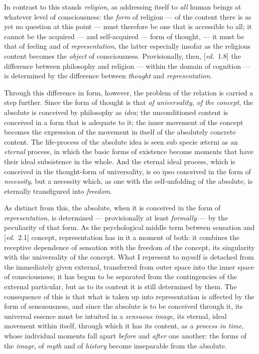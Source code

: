 \documentclass[12pt,a4paper,openany]{book}
\newcommand{\kpage}[1]{\marginnote{\footnotesize\textit{[#1]}}}
\newcommand{\ed}[1]{{\small[\textit{ed.}\ #1]}}
\begin{document}
In contrast to this stands \emph{religion}, as addressing itself to \emph{all}
human beings at whatever level of consciousness: the \emph{form} of religion
--- of the content there is as yet no question at this point --- must therefore
be one that is accessible to all; it cannot be the acquired
--- and self-acquired --- form of thought, --- it must be that of feeling
and of \emph{representation}, the latter especially insofar as the religious content
becomes the \emph{object} of consciousness. Provisionally, then, \ed{1.8} the difference
between philosophy and religion --- within the domain of cognition
--- is determined by the difference between \emph{thought} and \emph{representation}.

Through this difference in form, however, the problem of the relation is carried
a step further. Since the form of thought is that \emph{of universality, of the concept},
the absolute is conceived by philosophy as \emph{idea}; the unconditioned
content is conceived in a form that is adequate to it;
the inner movement of the concept becomes the expression of the movement in itself
of the absolutely concrete content. The life-process of the absolute idea is seen
sub specie æterni as an \emph{eternal} process, in which the basic forms of existence
become moments that have their ideal subsistence in the whole.
And the eternal ideal process, which is conceived in the thought-form
of universality, is eo ipso conceived in the form of \emph{necessity}, but a necessity
which, as one with the self-unfolding of the absolute, is eternally transfigured
into \emph{freedom}.

As distinct from this, the absolute, when it is conceived in the form of \emph{representation},
is determined --- provisionally at least \emph{formally} --- by the
peculiarity of that form. As the psychological middle term between
sensation and \ed{2.1} concept, representation has in it a moment of
both: it combines the receptive dependence of sensation with
the freedom of the concept, its singularity with the universality of the concept.
What I represent to myself is detached from the immediately given external,
transferred from outer space into the inner space of consciousness; it has begun
to be separated from the contingencies of the external particular, but as to its content
it is still determined by them. The consequence of this is that what is
taken up into representation is affected by the form of sensuousness, and since
the absolute is to be conceived through it, its universal essence must
be intuited in a \emph{sensuous image}, its eternal, ideal movement within itself,
through which it has its content, as a \emph{process in time}, whose individual
\kpage{78}moments fall apart \emph{before} and \emph{after} one another: the forms of the \emph{image}, of \emph{myth}
and of \emph{history} become inseparable from the absolute.
\end{document}

